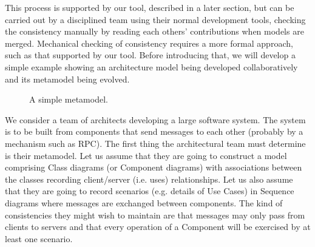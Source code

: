 \documentclass[times, 10pt,twocolumn]{article}
\begin{document}
This process is supported by our tool, described in a later section, but can be carried out by a disciplined team using their normal development tools, checking the consistency manually by reading each others' contributions when models are merged. Mechanical checking of consistency requires a more formal approach, such as that supported by our tool. Before introducing that, we will develop a simple example showing an architecture model being developed collaboratively and its metamodel being evolved.
\begin{figure}
  \centering
   {}
   \caption{A simple metamodel.}
\end{figure}



\noindent We consider a team of architects developing a large software system. The system is to be built from components that send messages to each other (probably by a mechanism such as RPC). The first thing the architectural team must determine is their metamodel. Let us assume that they are going to construct a model comprising Class diagrams (or Component diagrams) with associations between the classes recording client/server (i.e. uses) relationships. Let us also assume that they are going to record scenarios (e.g. details of Use Cases) in Sequence diagrams where messages are exchanged between components. The kind of consistencies they might wish to maintain are that messages may only pass from clients to servers and that every operation of a Component will be exercised by at least one scenario.
\end{document}
